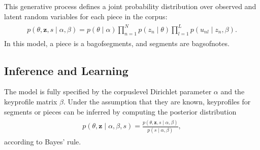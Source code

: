 \documentclass[letterpaper,10pt,english]{sphinxmanual}
\begin{document}
\sphinxAtStartPar
This generative process defines a joint probability distribution over
observed and latent random variables for each piece in the corpus:
\begin{equation*}
\begin{split}\begin{aligned}
    p(\theta, \mathbf z, s \mid \alpha, \beta) = p(\theta \mid \alpha)\prod_{n=1}^N p(z_n \mid \theta) \prod_{l=1}^L p(u_{nl} \mid z_n, \beta).\end{aligned}\end{split}
\end{equation*}
\sphinxAtStartPar
In this model, a piece is a bag\sphinxhyphen{}of\sphinxhyphen{}segments, and segments are
bags\sphinxhyphen{}of\sphinxhyphen{}notes.


\subsection{Inference and Learning}
\label{\detokenize{topic_modeling:inference-and-learning}}
\sphinxAtStartPar
The model is fully specified by the corpus\sphinxhyphen{}level Dirichlet parameter
\(\alpha\) and the key\sphinxhyphen{}profile matrix \(\beta\). Under the
assumption that they are known, key\sphinxhyphen{}profiles for segments or pieces can
be inferred by computing the posterior distribution
\begin{equation*}
\begin{split}\begin{aligned}
    p(\theta, \mathbf z \mid \alpha, \beta, s) = \frac{p(\theta, \mathbf z, s \mid \alpha, \beta)}{p(s\mid \alpha, \beta)},\end{aligned}\end{split}
\end{equation*}
\sphinxAtStartPar
according to Bayes’ rule.
\end{document}
